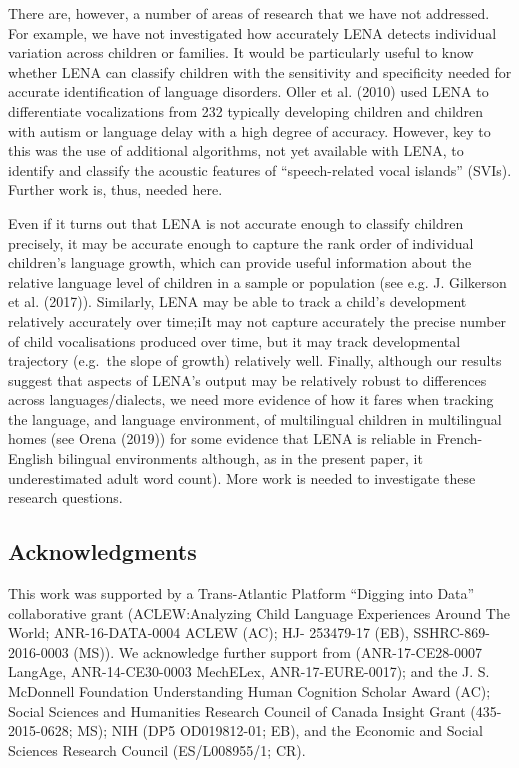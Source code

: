 \documentclass[english,floatsintext,man]{apa6}
\begin{document}
There are, however, a number of areas of research that we have not
addressed. For example, we have not investigated how accurately LENA
detects individual variation across children or families. It would be
particularly useful to know whether LENA can classify children with the
sensitivity and specificity needed for accurate identification of
language disorders. Oller et al. (2010) used LENA to differentiate
vocalizations from 232 typically developing children and children with
autism or language delay with a high degree of accuracy. However, key to
this was the use of additional algorithms, not yet available with LENA,
to identify and classify the acoustic features of
\enquote{speech-related vocal islands} (SVIs). Further work is, thus,
needed here.

Even if it turns out that LENA is not accurate enough to classify
children precisely, it may be accurate enough to capture the rank order
of individual children's language growth, which can provide useful
information about the relative language level of children in a sample or
population (see e.g. J. Gilkerson et al. (2017)). Similarly, LENA may be
able to track a child's development relatively accurately over time;iIt
may not capture accurately the precise number of child vocalisations
produced over time, but it may track developmental trajectory (e.g.~the
slope of growth) relatively well. Finally, although our results suggest
that aspects of LENA's output may be relatively robust to differences
across languages/dialects, we need more evidence of how it fares when
tracking the language, and language environment, of multilingual
children in multilingual homes (see Orena (2019)) for some evidence that
LENA is reliable in French-English bilingual environments although, as
in the present paper, it underestimated adult word count). More work is
needed to investigate these research questions.

\subsection{Acknowledgments}\label{acknowledgments}

This work was supported by a Trans-Atlantic Platform \enquote{Digging
into Data} collaborative grant (ACLEW:Analyzing Child Language
Experiences Around The World; ANR-16-DATA-0004 ACLEW (AC); HJ- 253479-17
(EB), SSHRC-869-2016-0003 (MS)). We acknowledge further support from
(ANR-17-CE28-0007 LangAge, ANR-14-CE30-0003 MechELex, ANR-17-EURE-0017);
and the J. S. McDonnell Foundation Understanding Human Cognition Scholar
Award (AC); Social Sciences and Humanities Research Council of Canada
Insight Grant (435-2015-0628; MS); NIH (DP5 OD019812-01; EB), and the
Economic and Social Sciences Research Council (ES/L008955/1; CR).
\end{document}
